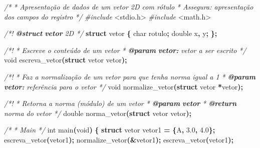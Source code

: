 \documentclass[
  11pt,
  a4paper,
]{scrbook}
\newenvironment{Shaded}{\begin{snugshade}}{\end{snugshade}}
\newcommand{\AnnotationTok}[1]{\textcolor[rgb]{0.56,0.35,0.01}{\textbf{\textit{#1}}}}
\newcommand{\CharTok}[1]{\textcolor[rgb]{0.31,0.60,0.02}{#1}}
\newcommand{\CommentTok}[1]{\textcolor[rgb]{0.56,0.35,0.01}{\textit{#1}}}
\newcommand{\CommentVarTok}[1]{\textcolor[rgb]{0.56,0.35,0.01}{\textbf{\textit{#1}}}}
\newcommand{\DataTypeTok}[1]{\textcolor[rgb]{0.13,0.29,0.53}{#1}}
\newcommand{\FloatTok}[1]{\textcolor[rgb]{0.00,0.00,0.81}{#1}}
\newcommand{\ImportTok}[1]{#1}
\newcommand{\KeywordTok}[1]{\textcolor[rgb]{0.13,0.29,0.53}{\textbf{#1}}}
\newcommand{\NormalTok}[1]{#1}
\newcommand{\OperatorTok}[1]{\textcolor[rgb]{0.81,0.36,0.00}{\textbf{#1}}}
\newcommand{\PreprocessorTok}[1]{\textcolor[rgb]{0.56,0.35,0.01}{\textit{#1}}}
\begin{document}
\begin{Shaded}
\begin{Highlighting}[]
\CommentTok{/*}
\CommentTok{ * Apresentação de dados de um vetor 2D com rótulo}
\CommentTok{ * Assegura: apresentação dos campos do registro}
\CommentTok{ */}
\PreprocessorTok{\#include }\ImportTok{\textless{}stdio.h\textgreater{}}
\PreprocessorTok{\#include }\ImportTok{\textless{}math.h\textgreater{}}

\CommentTok{/*! }\AnnotationTok{@struct}\CommentTok{ }\CommentVarTok{vetor}\CommentTok{ 2D */}
\KeywordTok{struct}\NormalTok{ vetor }\OperatorTok{\{}
    \DataTypeTok{char}\NormalTok{ rotulo}\OperatorTok{;}
    \DataTypeTok{double}\NormalTok{ x}\OperatorTok{,}\NormalTok{ y}\OperatorTok{;}
\OperatorTok{\};}

\CommentTok{/*!}
\CommentTok{ * Escreve o conteúdo de um vetor}
\CommentTok{ * }\AnnotationTok{@param}\CommentTok{ }\CommentVarTok{vetor:}\CommentTok{ vetor a ser escrito}
\CommentTok{ */}
\DataTypeTok{void}\NormalTok{ escreva\_vetor}\OperatorTok{(}\KeywordTok{struct}\NormalTok{ vetor vetor}\OperatorTok{);}

\CommentTok{/*!}
\CommentTok{ * Faz a normalização de um vetor para que tenha norma igual a 1}
\CommentTok{ * }\AnnotationTok{@param}\CommentTok{ }\CommentVarTok{vetor:}\CommentTok{ referência para o vetor}
\CommentTok{ */}
\DataTypeTok{void}\NormalTok{ normalize\_vetor}\OperatorTok{(}\KeywordTok{struct}\NormalTok{ vetor }\OperatorTok{*}\NormalTok{vetor}\OperatorTok{);}

\CommentTok{/*!}
\CommentTok{ * Retorna a norma (módulo) de um vetor}
\CommentTok{ * }\AnnotationTok{@param}\CommentTok{ }\CommentVarTok{vetor}
\CommentTok{ * }\AnnotationTok{@return}\CommentTok{ norma do vetor}
\CommentTok{ */}
\DataTypeTok{double}\NormalTok{ norma\_vetor}\OperatorTok{(}\KeywordTok{struct}\NormalTok{ vetor vetor}\OperatorTok{);}

\CommentTok{/*}
\CommentTok{ * Main}
\CommentTok{ */}
\DataTypeTok{int}\NormalTok{ main}\OperatorTok{(}\DataTypeTok{void}\OperatorTok{)} \OperatorTok{\{}
    \KeywordTok{struct}\NormalTok{ vetor vetor1 }\OperatorTok{=} \OperatorTok{\{}\CharTok{\textquotesingle{}A\textquotesingle{}}\OperatorTok{,} \FloatTok{3.0}\OperatorTok{,} \FloatTok{4.0}\OperatorTok{\};}
\NormalTok{    escreva\_vetor}\OperatorTok{(}\NormalTok{vetor1}\OperatorTok{);}
\NormalTok{    normalize\_vetor}\OperatorTok{(\&}\NormalTok{vetor1}\OperatorTok{);}
\NormalTok{    escreva\_vetor}\OperatorTok{(}\NormalTok{vetor1}\OperatorTok{);}


\end{Highlighting}
\end{Shaded}
\end{document}
